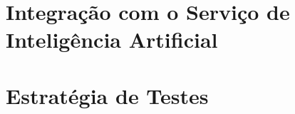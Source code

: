 \section{Integração com o Serviço de Inteligência Artificial}
\label{sec:implementacao_ai}

%
%

\section{Estratégia de Testes}
\label{sec:testes}

